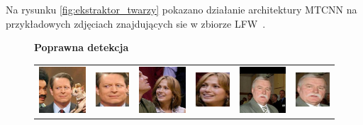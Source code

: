 Na rysunku \ref{fig:ekstraktor_twarzy} pokazano działanie architektury MTCNN na przykładowych zdjęciach znajdujących sie w zbiorze LFW~\cite{DatasetLFW}.

\begin{figure}[H]
    \begin{center}
    \renewcommand\tabcolsep{1pt}
    {\bf Poprawna detekcja}
    \begin{tabular}{cc||cc||cc}
      \includegraphics[width=.15\linewidth]{img/crop_examples/before/good/Al_Gore_0007.jpg} &
      \includegraphics[width=.15\linewidth]{img/crop_examples/after/good/Al_Gore_0007.jpg} &
      \includegraphics[width=.15\linewidth]{img/crop_examples/before/good/Jennifer_Lopez_0021.jpg} &
      \includegraphics[width=.15\linewidth]{img/crop_examples/after/good/Jennifer_Lopez_0021.jpg} &
      \includegraphics[width=.15\linewidth]{img/crop_examples/before/good/Lech_Walesa_0002.jpg} &
      \includegraphics[width=.15\linewidth]{img/crop_examples/after/good/Lech_Walesa_0002.jpg} \\
    \end{tabular}

\end{center}
\end{figure}
